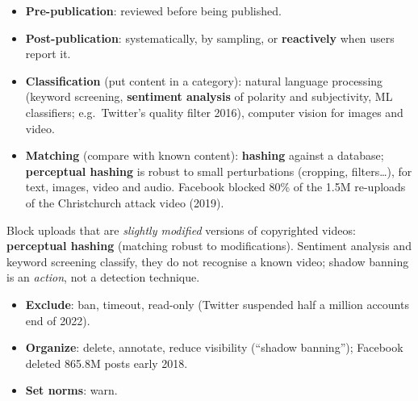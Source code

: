 \documentclass[11pt,a4paper,openany]{book}
\begin{document}
\begin{propbox}[title={Identification: when?}]
\begin{itemize}
  \item \textbf{Pre-publication}: reviewed before being published.
  \item \textbf{Post-publication}: systematically, by sampling, or \textbf{reactively} when
        users report it.
\end{itemize}
\end{propbox}

\begin{propbox}[title={Identification: how?}]
\begin{itemize}
  \item \textbf{Classification} (put content in a category): natural language processing
        (keyword screening, \textbf{sentiment analysis} of polarity and subjectivity, ML
        classifiers; e.g.\ Twitter's quality filter 2016), computer vision for images and video.
  \item \textbf{Matching} (compare with known content): \textbf{hashing} against a database;
        \textbf{perceptual hashing} is robust to small perturbations (cropping, filters\ldots),
        for text, images, video and audio. Facebook blocked 80\% of the 1.5M re-uploads of the
        Christchurch attack video (2019).
\end{itemize}
\end{propbox}

\begin{exbox}[title={Review question}]
Block uploads that are \emph{slightly modified} versions of copyrighted videos:
\textbf{perceptual hashing} (matching robust to modifications). Sentiment analysis and keyword
screening classify, they do not recognise a known video; shadow banning is an \emph{action}, not
a detection technique.
\end{exbox}

\begin{propbox}[title={Actions (Jiang et al., 2023), from harsh to soft}]
\begin{itemize}
  \item \textbf{Exclude}: ban, timeout, read-only (Twitter suspended half a million accounts end
        of 2022).
  \item \textbf{Organize}: delete, annotate, reduce visibility (``shadow banning''); Facebook
        deleted 865.8M posts early 2018.
  \item \textbf{Set norms}: warn.
\end{itemize}
\end{propbox}
\end{document}
